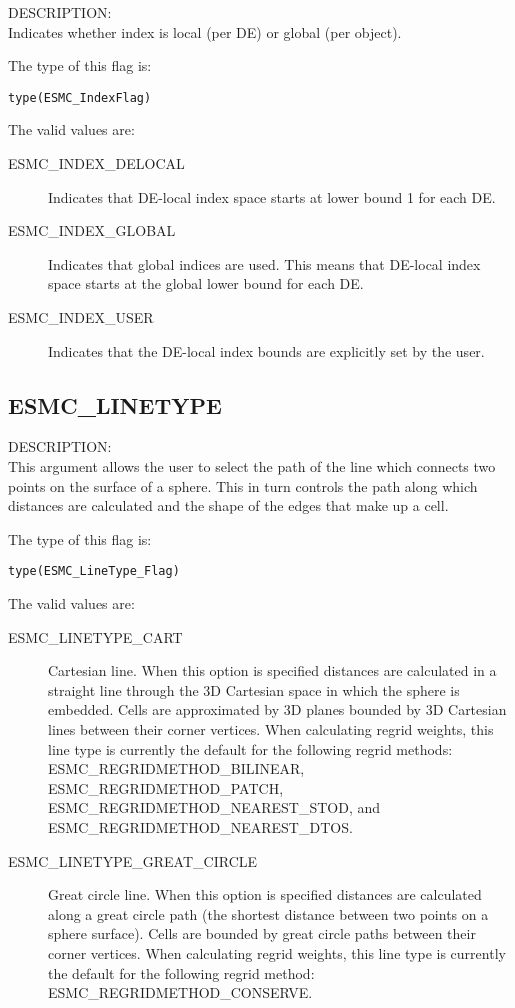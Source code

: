 {\sf DESCRIPTION:\\}
Indicates whether index is local (per DE) or global (per object).

The type of this flag is:

{\tt type(ESMC\_IndexFlag)}

The valid values are:
\begin{description}
\item [ESMC\_INDEX\_DELOCAL]
      Indicates that DE-local index space starts at lower bound 1 for each DE.
\item [ESMC\_INDEX\_GLOBAL]
      Indicates that global indices are used. This means that DE-local index
      space starts at the global lower bound for each DE.
\item [ESMC\_INDEX\_USER]
      Indicates that the DE-local index bounds are explicitly set by the user.
\end{description}

\subsection{ESMC\_LINETYPE}
\label{opt:lineType}

{\sf DESCRIPTION:\\}  This argument allows the user to select the path of the 
line which connects two points on the surface of a sphere.
This in turn controls the path along which distances are calculated and the 
shape of the edges that make up a cell.

The type of this flag is:

{\tt type(ESMC\_LineType\_Flag)}

The valid values are:
\begin{description}
\item [ESMC\_LINETYPE\_CART]
    Cartesian line. When this option is specified distances are calculated in a 
    straight line through the 3D Cartesian space in which the sphere is 
    embedded. Cells are approximated by 3D planes bounded by 3D Cartesian lines 
    between their corner vertices.
    When calculating regrid weights, this line type is currently the default for 
    the following regrid methods: ESMC\_REGRIDMETHOD\_BILINEAR,
    ESMC\_REGRIDMETHOD\_PATCH, ESMC\_REGRIDMETHOD\_NEAREST\_STOD, and 
    ESMC\_REGRIDMETHOD\_NEAREST\_DTOS.
\item [ESMC\_LINETYPE\_GREAT\_CIRCLE]
    Great circle line. When this option is specified distances are calculated 
    along a great circle path (the shortest distance between two points on a 
    sphere surface). Cells are bounded by great circle paths between their 
    corner vertices. When calculating regrid weights, this line type is 
    currently the default for the following regrid method: 
    ESMC\_REGRIDMETHOD\_CONSERVE.
\end{description}


